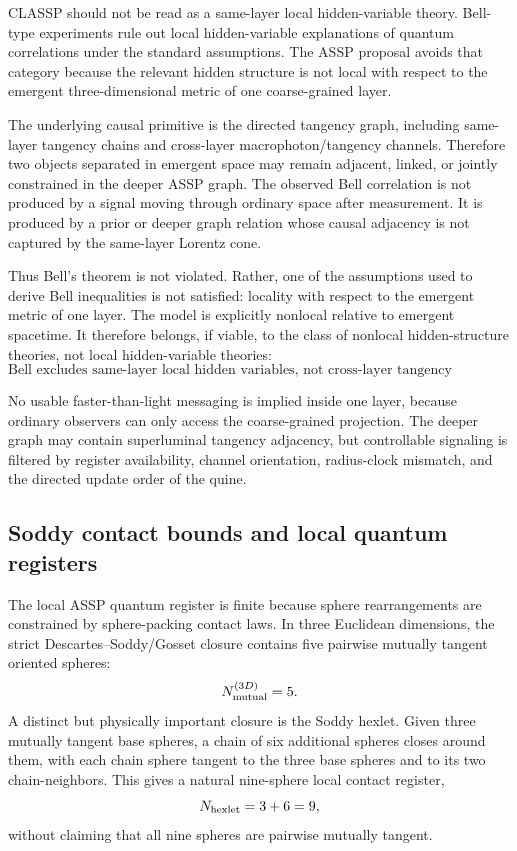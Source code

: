 \documentclass[11pt,a4paper]{article}
\begin{document}
CLASSP should not be read as a same-layer local hidden-variable theory.
Bell-type experiments rule out local hidden-variable explanations of quantum
correlations under the standard assumptions.  The ASSP proposal avoids that
category because the relevant hidden structure is not local with respect to
the emergent three-dimensional metric of one coarse-grained layer.

The underlying causal primitive is the directed tangency graph, including
same-layer tangency chains and cross-layer macrophoton/tangency channels.
Therefore two objects separated in emergent space may remain adjacent, linked,
or jointly constrained in the deeper ASSP graph.  The observed Bell correlation
is not produced by a signal moving through ordinary space after measurement.
It is produced by a prior or deeper graph relation whose causal adjacency is
not captured by the same-layer Lorentz cone.

Thus Bell's theorem is not violated.  Rather, one of the assumptions used to
derive Bell inequalities is not satisfied: locality with respect to the
emergent metric of one layer.  The model is explicitly nonlocal relative to
emergent spacetime.  It therefore belongs, if viable, to the class of nonlocal
hidden-structure theories, not local hidden-variable theories:
\begin{equation}
  \boxed{
  \text{Bell excludes same-layer local hidden variables, not cross-layer
  tangency adjacency.}
  }
  \label{eq:bell_cross_layer}
\end{equation}

No usable faster-than-light messaging is implied inside one layer, because
ordinary observers can only access the coarse-grained projection.  The deeper
graph may contain superluminal tangency adjacency, but controllable signaling
is filtered by register availability, channel orientation, radius-clock
mismatch, and the directed update order of the quine.

\subsection{Soddy contact bounds and local quantum registers}

The local ASSP quantum register is finite because sphere rearrangements are
constrained by sphere-packing contact laws.  In three Euclidean dimensions, the
strict Descartes--Soddy/Gosset closure contains five pairwise mutually tangent
oriented spheres:
\begin{equation}
  N_{\rm mutual}^{(3D)}=5.
  \label{eq:five_mutual_spheres}
\end{equation}
A distinct but physically important closure is the Soddy hexlet.  Given three
mutually tangent base spheres, a chain of six additional spheres closes around
them, with each chain sphere tangent to the three base spheres and to its two
chain-neighbors.  This gives a natural nine-sphere local contact register,
\begin{equation}
  N_{\rm hexlet}=3+6=9,
  \label{eq:hexlet_nine}
\end{equation}
without claiming that all nine spheres are pairwise mutually tangent.
\end{document}
